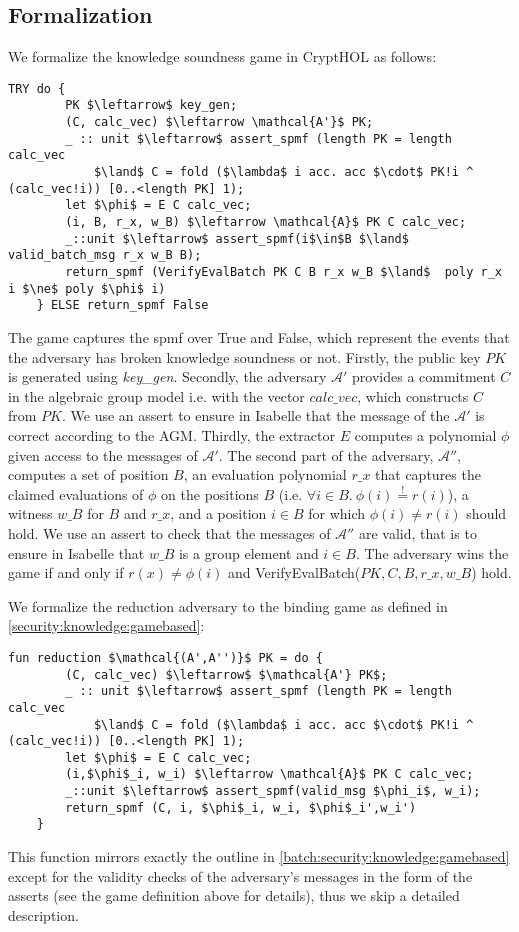 \subsection*{Formalization}
We formalize the knowledge soundness game in CryptHOL as follows: 
\begin{lstlisting}[language=isabelle]
    TRY do {
        PK $\leftarrow$ key_gen;
        (C, calc_vec) $\leftarrow \mathcal{A'}$ PK;
        _ :: unit $\leftarrow$ assert_spmf (length PK = length calc_vec 
            $\land$ C = fold ($\lambda$ i acc. acc $\cdot$ PK!i ^ (calc_vec!i)) [0..<length PK] 1);
        let $\phi$ = E C calc_vec;
        (i, B, r_x, w_B) $\leftarrow \mathcal{A}$ PK C calc_vec;
        _::unit $\leftarrow$ assert_spmf(i$\in$B $\land$ valid_batch_msg r_x w_B B);
        return_spmf (VerifyEvalBatch PK C B r_x w_B $\land$  poly r_x i $\ne$ poly $\phi$ i)
    } ELSE return_spmf False
\end{lstlisting}
The game captures the spmf over True and False, which represent the events that the adversary has broken knowledge soundness or not.
Firstly, the public key $PK$ is generated using \textit{key\_gen}. 
Secondly, the adversary $\mathcal{A'}$ provides a commitment $C$ in the algebraic group model i.e. with the vector $calc\_vec$, which constructs $C$ from $PK$. We use an assert to ensure in Isabelle that the message of the $\mathcal{A'}$ is correct according to the AGM.
Thirdly, the extractor $E$ computes a polynomial $\phi$ given access to the messages of $\mathcal{A'}$. 
The second part of the adversary, $\mathcal{A''}$, computes a set of position $B$, an evaluation polynomial $r\_x$ that captures the claimed evaluations of $\phi$ on the positions $B$ (i.e. $\forall i\in B.\ \phi(i)\stackrel{!}{=}r(i)$), a witness $w\_B$ for $B$ and $r\_x$, and a position $i\in B$ for which $\phi(i)\ne r(i)$ should hold. We use an assert to check that the messages of $\mathcal{A''}$ are valid, that is to ensure in Isabelle that $w\_B$ is a group element and $i\in B$.
The adversary wins the game if and only if $r(x) \ne \phi(i)$ and VerifyEvalBatch($PK,C,B, r\_x, w\_B$) hold.

We formalize the reduction adversary to the binding game as defined in \ref{security:knowledge:gamebased}: 
\begin{lstlisting}[language=isabelle]
    fun reduction $\mathcal{(A',A'')}$ PK = do {
        (C, calc_vec) $\leftarrow$ $\mathcal{A'} PK$;
        _ :: unit $\leftarrow$ assert_spmf (length PK = length calc_vec 
            $\land$ C = fold ($\lambda$ i acc. acc $\cdot$ PK!i ^ (calc_vec!i)) [0..<length PK] 1);
        let $\phi$ = E C calc_vec;
        (i,$\phi$_i, w_i) $\leftarrow \mathcal{A}$ PK C calc_vec;
        _::unit $\leftarrow$ assert_spmf(valid_msg $\phi_i$, w_i);
        return_spmf (C, i, $\phi$_i, w_i, $\phi$_i',w_i')
    }
\end{lstlisting}
This function mirrors exactly the outline in \ref{batch:security:knowledge:gamebased} except for the validity checks of the adversary's messages in the form of the asserts (see the game definition above for details), thus we skip a detailed description.